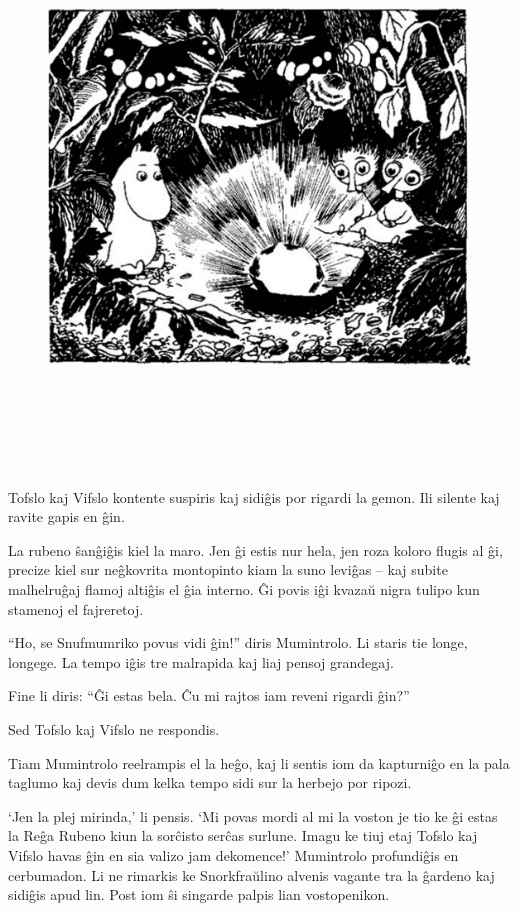 \begin{figure}[htbp]
\centering
\includegraphics[width=499pt,height=423pt]{_33.jpg}
\caption{}
\label{_33}
\end{figure}

Tofslo kaj Vifslo kontente suspiris kaj sidiĝis por rigardi la gemon. Ili silente kaj ravite gapis en ĝin.

La rubeno ŝanĝiĝis kiel la maro. Jen ĝi estis nur hela, jen roza koloro flugis al ĝi, precize kiel sur neĝkovrita montopinto kiam la suno leviĝas -- kaj subite malhelruĝaj flamoj altiĝis el ĝia interno. Ĝi povis iĝi kvazaŭ nigra tulipo kun stamenoj el fajreretoj.

``Ho, se Snufmumriko povus vidi ĝin!'' diris Mumintrolo. Li staris tie longe, longege. La tempo iĝis tre malrapida kaj liaj pensoj grandegaj.

Fine li diris: ``Ĝi estas bela. Ĉu mi rajtos iam reveni rigardi ĝin?''

Sed Tofslo kaj Vifslo ne respondis.

Tiam Mumintrolo reelrampis el la heĝo, kaj li sentis iom da kapturniĝo en la pala taglumo kaj devis dum kelka tempo sidi sur la herbejo por ripozi.

`Jen la plej mirinda,' li pensis. `Mi povas mordi al mi la voston je tio ke ĝi estas la Reĝa Rubeno kiun la sorĉisto serĉas surlune. Imagu ke tiuj etaj Tofslo kaj Vifslo havas ĝin en sia valizo jam dekomence!' Mumintrolo profundiĝis en cerbumadon. Li ne rimarkis ke Snorkfraŭlino alvenis vagante tra la ĝardeno kaj sidiĝis apud lin. Post iom ŝi singarde palpis lian vostopenikon.

